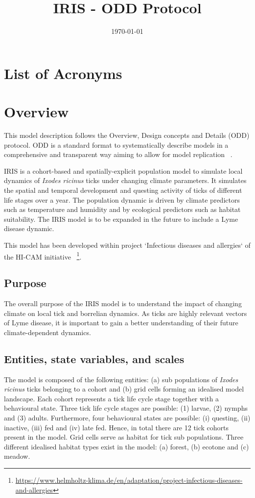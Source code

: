 \documentclass[a4paper, 11pt]{scrartcl}
\title{IRIS - ODD Protocol}
\author{}
\date{\today}
\begin{document}
\maketitle
\tableofcontents

\newpage
\listoffigures
\listoftables

\section*{List of Acronyms}
\begin{acronym}
\end{acronym}


\section{Overview}
This model description follows the Overview, Design concepts and Details (ODD) protocol. ODD is a standard format to systematically
describe models in a comprehensive and transparent way aiming to allow for model replication ~\parencite{Grimm.2010, Grimm.2020}.

IRIS is a cohort-based and spatially-explicit population model to simulate local dynamics of \textit{Ixodes ricinus} ticks under
changing climate parameters. It simulates the spatial and temporal development and questing activity of ticks of different life stages
over a year. The population dynamic is driven by climate predictors such as temperature and humidity and by ecological predictors such
as habitat suitability. The IRIS model is to be expanded in the future to include a Lyme disease dynamic.

This model has been developed within project `Infectious diseases and allergies` of the HI-CAM initiative
~\footnote{\url{https://www.helmholtz-klima.de/en/adaptation/project-infectious-diseases-and-allergies}}.


\subsection{Purpose}
The overall purpose of the IRIS model is to understand the impact of changing climate on local tick and borrelian dynamics. As
ticks are highly relevant vectors of Lyme disease, it is important to gain a better understanding of their future climate-dependent
dynamics.


\subsection{Entities, state variables, and scales}
The model is composed of the following entities: (a) sub populations of \textit{Ixodes ricinus} ticks belonging to a cohort and (b) grid
cells forming an idealised model landscape. Each cohort represents a tick life cycle stage together with a behavioural state. Three tick
life cycle stages are possible: (1) larvae, (2) nymphs and (3) adults. Furthermore, four behavioural states are possible: (i) questing,
(ii) inactive, (iii) fed and (iv) late fed. Hence, in total there are 12 tick cohorts present in the model. Grid cells serve as habitat for
tick sub populations. Three different idealised habitat types exist in the model: (a) forest, (b) ecotone and (c) meadow.
\end{document}
